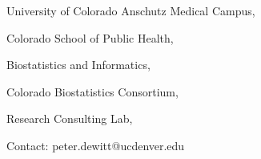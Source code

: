 \par\noindent ~~University of Colorado Anschutz Medical Campus,
\par\noindent ~~Colorado School of Public Health, 
\par\noindent ~~Biostatistics and Informatics, 
\par\noindent ~~Colorado Biostatistics Consortium,
\par\noindent ~~Research Consulting Lab,
\par\noindent ~~Contact: peter.dewitt@ucdenver.edu
